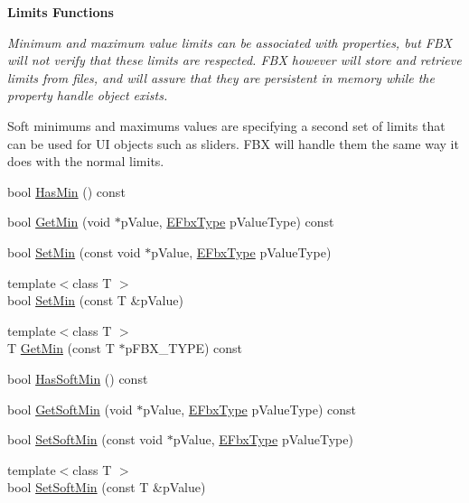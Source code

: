 \begin{Indent}\textbf{ Limits Functions}\par
{\em Minimum and maximum value limits can be associated with properties, but F\+BX will not verify that these limits are respected. F\+BX however will store and retrieve limits from files, and will assure that they are persistent in memory while the property handle object exists.

Soft minimums and maximums values are specifying a second set of limits that can be used for UI objects such as sliders. F\+BX will handle them the same way it does with the normal limits. }\begin{DoxyCompactItemize}
\item 
bool \hyperlink{class_fbx_property_handle_a08cf85e6eda102f161bcb3c578e6c17b}{Has\+Min} () const
\item 
bool \hyperlink{class_fbx_property_handle_a722440b0f9ee5b206e38fe06c375ec4d}{Get\+Min} (void $\ast$p\+Value, \hyperlink{fbxpropertytypes_8h_a73913a5ddfb20e57c6f25e9e6784bd92}{E\+Fbx\+Type} p\+Value\+Type) const
\item 
bool \hyperlink{class_fbx_property_handle_a699f3d09a345e575b75ebe97c089b82c}{Set\+Min} (const void $\ast$p\+Value, \hyperlink{fbxpropertytypes_8h_a73913a5ddfb20e57c6f25e9e6784bd92}{E\+Fbx\+Type} p\+Value\+Type)
\item 
{\footnotesize template$<$class T $>$ }\\bool \hyperlink{class_fbx_property_handle_ab37a7e2831a4ca20879d4b8b57877361}{Set\+Min} (const T \&p\+Value)
\item 
{\footnotesize template$<$class T $>$ }\\T \hyperlink{class_fbx_property_handle_a82ce751c67e19e87294a0083f09133c6}{Get\+Min} (const T $\ast$p\+F\+B\+X\+\_\+\+T\+Y\+PE) const
\item 
bool \hyperlink{class_fbx_property_handle_a487afcc8d481a7a64b0087e2bf313c94}{Has\+Soft\+Min} () const
\item 
bool \hyperlink{class_fbx_property_handle_a879e886ad129d780a9343def15bead82}{Get\+Soft\+Min} (void $\ast$p\+Value, \hyperlink{fbxpropertytypes_8h_a73913a5ddfb20e57c6f25e9e6784bd92}{E\+Fbx\+Type} p\+Value\+Type) const
\item 
bool \hyperlink{class_fbx_property_handle_af70fa8b28c77e394928d4e1e7cabe50d}{Set\+Soft\+Min} (const void $\ast$p\+Value, \hyperlink{fbxpropertytypes_8h_a73913a5ddfb20e57c6f25e9e6784bd92}{E\+Fbx\+Type} p\+Value\+Type)
\item 
{\footnotesize template$<$class T $>$ }\\bool \hyperlink{class_fbx_property_handle_a636d40ff360385c71587813842f6d004}{Set\+Soft\+Min} (const T \&p\+Value)

\end{DoxyCompactItemize}
\end{Indent}
